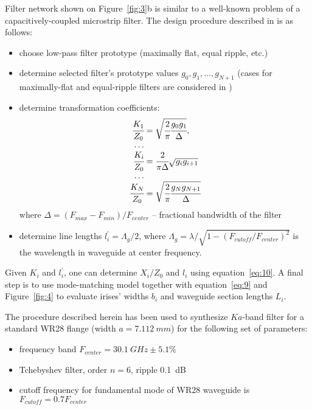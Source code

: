 \documentclass{pj}
\begin{document}
Filter network shown on Figure~\ref{fig:3}b is similar to a
well-known problem of a capacitively-coupled microstrip filter. The
design procedure described in \cite{pozar2012microwave} is as follows:
\begin{itemize}
\item choose low-pass filter prototype (maximally flat, equal ripple, etc.)
\item determine selected filter's prototype values
  $g_0, g_1, \dots, g_{N+1}$ (cases for maximally-flat and
  equal-ripple filters are considered in \cite{matthaei1980})
\item determine transformation coefficients:
  \begin{equation}
    \begin{array}{r@{}l}
      \cfrac{K_1}{Z_0} &{}= \sqrt{\cfrac{2}{\pi} \cfrac{g_0g_1}{\Delta}}, \\
      \dots \\
      \cfrac{K_i}{Z_0} &{}= \cfrac{2}{\pi \Delta}\sqrt{g_i g_{i+1}} \\
      \dots \\
      \cfrac{K_N}{Z_0} &{}= \sqrt{\cfrac{2}{\pi} \cfrac{g_N g_{N+1}}{\Delta}}
    \end{array}
    \label{eq:11}
  \end{equation}
  where $\Delta = (F_{max}-F_{min})/F_{center}$ -- fractional
  bandwidth of the filter
\item determine line lengths $l^{\prime}_i = \Lambda_g/2$, where
  $\Lambda_g = \lambda / \sqrt{1-(F_{cutoff}/F_{center})^2}$ is the
  wavelength in waveguide at center frequency.
\end{itemize}

Given $K_i$ and $l^{\prime}_i$, one can determine $X_i/Z_0$ and $l_i$
using equation~\eqref{eq:10}. A final step is to use mode-matching
model together with equation~\eqref{eq:9} and Figure~\ref{fig:4} to
evaluate irises' widths $b_i$ and waveguide section lengths $L_i$.

The procedure described herein has been used to synthesize $Ka$-band
filter for a standard WR28 flange (width $a = 7.112~mm$) for the
following set of parameters:
\begin{itemize}
\item frequency band $F_{center} = 30.1~GHz \pm 5.1\%$
\item Tchebyshev filter, order $n = 6$, ripple 0.1~dB
\item cutoff frequency for fundamental mode of WR28 waveguide is
  $F_{cutoff} = 0.7 F_{center}$
\end{itemize}
\end{document}
